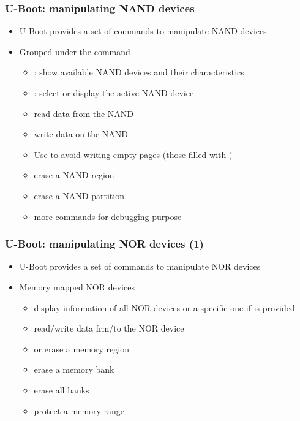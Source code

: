 \begin{frame}
  \frametitle{U-Boot: manipulating NAND devices}
  \begin{itemize}
  \item U-Boot provides a set of commands to manipulate NAND devices
  \item Grouped under the  command
    \begin{itemize}
    \item {}: show available NAND devices and their
      characteristics
    \item {}: select or display the active NAND
      device
    \item {} read
      data from the NAND
    \item {} write
      data on the NAND
    \item Use  to avoid writing empty pages
      (those filled with )
    \item {} erase a NAND region
    \item {} erase a NAND partition
    \item more commands for debugging purpose
    \end{itemize}
  \end{itemize}
\end{frame}

\begin{frame}
  \frametitle{U-Boot: manipulating NOR devices (1)}
  \begin{itemize}
  \item U-Boot provides a set of commands to manipulate NOR devices
  \item Memory mapped NOR devices
    \begin{itemize}
    \item {} display information of all NOR devices
      or a specific one if  is provided
    \item {} read/write data frm/to
      the NOR device
    \item {} or 
      erase a memory region
    \item {} erase a memory bank
    \item {} erase all banks
    \item {} protect a memory
      range
    \end{itemize}
  \end{itemize}
\end{frame}

